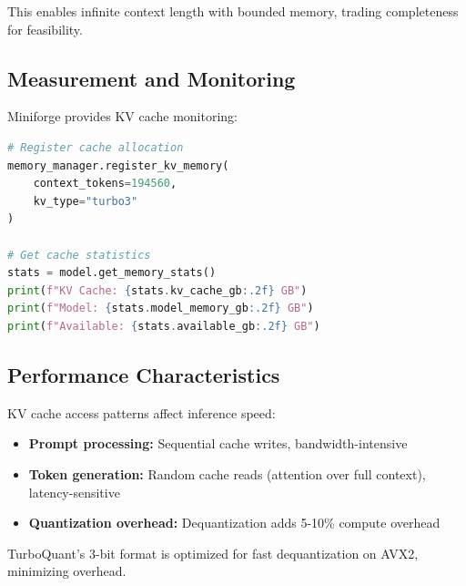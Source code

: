 This enables infinite context length with bounded memory, trading completeness for feasibility.

\subsection{Measurement and Monitoring}

Miniforge provides KV cache monitoring:

\begin{lstlisting}[language=Python, caption=KV Cache Monitoring]
# Register cache allocation
memory_manager.register_kv_memory(
    context_tokens=194560,
    kv_type="turbo3"
)

# Get cache statistics
stats = model.get_memory_stats()
print(f"KV Cache: {stats.kv_cache_gb:.2f} GB")
print(f"Model: {stats.model_memory_gb:.2f} GB")
print(f"Available: {stats.available_gb:.2f} GB")
\end{lstlisting}

\subsection{Performance Characteristics}

KV cache access patterns affect inference speed:

\begin{itemize}
    \item \textbf{Prompt processing:} Sequential cache writes, bandwidth-intensive
    \item \textbf{Token generation:} Random cache reads (attention over full context), latency-sensitive
    \item \textbf{Quantization overhead:} Dequantization adds 5-10\% compute overhead
\end{itemize}

TurboQuant's 3-bit format is optimized for fast dequantization on AVX2, minimizing overhead.
